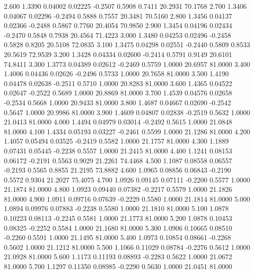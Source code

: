    2.600   1.3390   0.04002   0.02225  -0.2507   0.5908   0.7411  20.2931  70.1768
   2.700   1.3406   0.04067   0.02296  -0.2494   0.5888   0.7557  20.3481  70.5160
   2.800   1.3456   0.04137   0.02366  -0.2488   0.5867   0.7760  20.4054  70.9850
   2.900   1.3454   0.04196   0.02434  -0.2470   0.5848   0.7938  20.4564  71.4223
   3.000   1.3480   0.04253   0.02496  -0.2458   0.5828   0.8205  20.5108  72.0835
   3.100   1.3475   0.04298   0.02551  -0.2440   0.5809   0.8533  20.5619  72.9539
   3.200   1.3428   0.04334   0.02600  -0.2414   0.5791   0.9149  20.6101  74.8411
   3.300   1.3773   0.04389   0.02612  -0.2469   0.5759   1.0000  20.6957  81.0000
   3.400   1.4006   0.04436   0.02626  -0.2496   0.5733   1.0000  20.7658  81.0000
   3.500   1.4190   0.04478   0.02638  -0.2511   0.5710   1.0000  20.8283  81.0000
   3.600   1.4365   0.04522   0.02647  -0.2522   0.5689   1.0000  20.8869  81.0000
   3.700   1.4539   0.04576   0.02658  -0.2534   0.5668   1.0000  20.9433  81.0000
   3.800   1.4687   0.04667   0.02690  -0.2542   0.5647   1.0000  20.9986  81.0000
   3.900   1.4609   0.04807   0.02838  -0.2519   0.5632   1.0000  21.0413  81.0000
   4.000   1.4494   0.04979   0.03014  -0.2492   0.5615   1.0000  21.0848  81.0000
   4.100   1.4334   0.05193   0.03227  -0.2461   0.5599   1.0000  21.1286  81.0000
   4.200   1.4057   0.05494   0.03525  -0.2419   0.5582   1.0000  21.1757  81.0000
   4.300   1.1889   0.07431   0.05445  -0.2238   0.5557   1.0000  21.2415  81.0000
   4.400   1.1241   0.08153   0.06172  -0.2191   0.5563   0.9029  21.2261  74.4468
   4.500   1.1087   0.08558   0.06557  -0.2193   0.5565   0.8855  21.2195  73.8882
   4.600   1.0965   0.08856   0.06843  -0.2190   0.5572   0.9304  21.2027  75.4075
   4.700   1.0926   0.09145   0.07111  -0.2200   0.5577   1.0000  21.1874  81.0000
   4.800   1.0923   0.09440   0.07382  -0.2217   0.5579   1.0000  21.1826  81.0000
   4.900   1.0911   0.09716   0.07639  -0.2229   0.5580   1.0000  21.1814  81.0000
   5.000   1.0894   0.09976   0.07883  -0.2238   0.5580   1.0000  21.1810  81.0000
   5.100   1.0878   0.10223   0.08113  -0.2245   0.5581   1.0000  21.1773  81.0000
   5.200   1.0878   0.10453   0.08325  -0.2252   0.5584   1.0000  21.1680  81.0000
   5.300   1.0906   0.10665   0.08510  -0.2260   0.5591   1.0000  21.1495  81.0000
   5.400   1.0973   0.10854   0.08661  -0.2268   0.5602   1.0000  21.1212  81.0000
   5.500   1.1066   0.11029   0.08784  -0.2276   0.5612   1.0000  21.0928  81.0000
   5.600   1.1173   0.11193   0.08893  -0.2283   0.5622   1.0000  21.0672  81.0000
   5.700   1.1297   0.11350   0.08985  -0.2290   0.5630   1.0000  21.0451  81.0000
